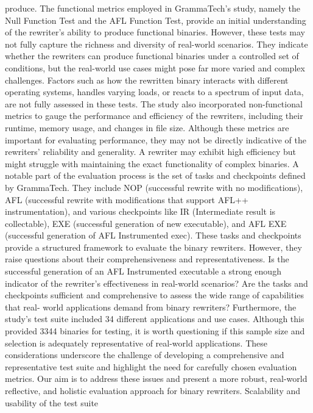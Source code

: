 \documentclass[a4paper,11pt,oneside]{report}
\begin{document}
produce.
The functional metrics employed in GrammaTech's study, namely the Null Function
Test and the AFL Function Test, provide an initial understanding of the rewriter's ability to
produce functional binaries. However, these tests may not fully capture the richness and
diversity of real-world scenarios. They indicate whether the rewriters can produce
functional binaries under a controlled set of conditions, but the real-world use cases might
pose far more varied and complex challenges. Factors such as how the rewritten binary
interacts with different operating systems, handles varying loads, or reacts to a spectrum of
input data, are not fully assessed in these tests.
The study also incorporated non-functional metrics to gauge the performance and
efficiency of the rewriters, including their runtime, memory usage, and changes in file size.
Although these metrics are important for evaluating performance, they may not be directly
indicative of the rewriters' reliability and generality. A rewriter may exhibit high efficiency
but might struggle with maintaining the exact functionality of complex binaries.
A notable part of the evaluation process is the set of tasks and checkpoints defined
by GrammaTech. They include NOP (successful rewrite with no modifications), AFL
(successful rewrite with modifications that support AFL++ instrumentation), and various
checkpoints like IR (Intermediate result is collectable), EXE (successful generation of new
executable), and AFL EXE (successful generation of AFL Instrumented exec).
These tasks and checkpoints provide a structured framework to evaluate the binary
rewriters. However, they raise questions about their comprehensiveness and
representativeness. Is the successful generation of an AFL Instrumented executable a strong
enough indicator of the rewriter's effectiveness in real-world scenarios? Are the tasks and
checkpoints sufficient and comprehensive to assess the wide range of capabilities that real-
world applications demand from binary rewriters?
Furthermore, the study's test suite included 34 different applications and use cases.
Although this provided 3344 binaries for testing, it is worth questioning if this sample size
and selection is adequately representative of real-world applications.
These considerations underscore the challenge of developing a comprehensive and
representative test suite and highlight the need for carefully chosen evaluation metrics. Our
aim is to address these issues and present a more robust, real-world reflective, and holistic
evaluation approach for binary rewriters.
Scalability and usability of the test suite
\end{document}
